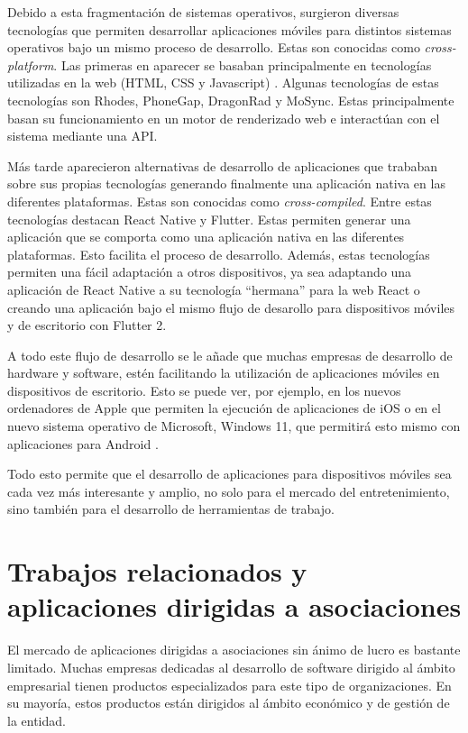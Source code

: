 Debido a esta fragmentación de sistemas operativos, surgieron diversas tecnologías que permiten desarrollar aplicaciones móviles para distintos sistemas operativos bajo un mismo proceso de desarrollo. Estas son conocidas como \textit{cross-platform}. Las primeras en aparecer se basaban principalmente en tecnologías utilizadas en la web (HTML, CSS y Javascript) \cite{palmieri2012comparison}. Algunas tecnologías de estas tecnologías son Rhodes, PhoneGap, DragonRad y MoSync. Estas principalmente basan su funcionamiento en un motor de renderizado web e interactúan con el sistema mediante una API. 

Más tarde aparecieron alternativas de desarrollo de aplicaciones que trababan sobre sus propias tecnologías generando finalmente una aplicación nativa en las diferentes plataformas. Estas son conocidas como \textit{cross-compiled}. Entre estas tecnologías destacan React Native y Flutter. Estas permiten generar una aplicación que se comporta como una aplicación nativa en las diferentes plataformas. Esto facilita el proceso de desarrollo. Además, estas tecnologías permiten una fácil adaptación a otros dispositivos, ya sea adaptando una aplicación de React Native a su tecnología ``hermana'' para la web React o creando una aplicación bajo el mismo flujo de desarollo para dispositivos móviles y de escritorio con Flutter 2. 

A todo este flujo de desarrollo se le añade que muchas empresas de desarrollo de hardware y software, estén facilitando la utilización de aplicaciones móviles en dispositivos de escritorio. Esto se puede ver, por ejemplo, en los nuevos ordenadores de Apple que permiten la ejecución de aplicaciones de iOS \cite{macos-ios} o en el nuevo sistema operativo de Microsoft, Windows 11, que permitirá esto mismo con aplicaciones para Android \cite{windows-android}.

Todo esto permite que el desarrollo de aplicaciones para dispositivos móviles sea cada vez más interesante y amplio, no solo para el mercado del entretenimiento, sino también para el desarrollo de herramientas de trabajo.

\section{Trabajos relacionados y aplicaciones dirigidas a asociaciones}

El mercado de aplicaciones dirigidas a asociaciones sin ánimo de lucro es bastante limitado. Muchas empresas dedicadas al desarrollo de software dirigido al ámbito empresarial tienen productos especializados para este tipo de organizaciones. En su mayoría, estos productos están dirigidos al ámbito económico y de gestión de la entidad. 

